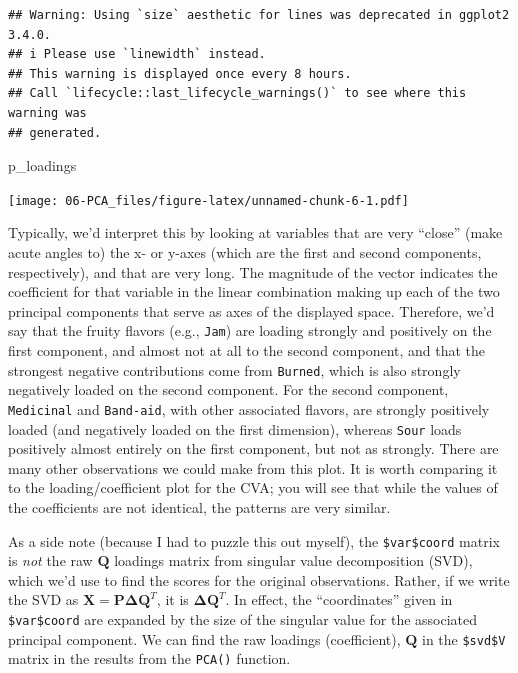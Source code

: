 \documentclass[
]{book}
\newenvironment{Shaded}{\begin{snugshade}}{\end{snugshade}}
\newcommand{\NormalTok}[1]{#1}
\begin{document}
\begin{verbatim}
## Warning: Using `size` aesthetic for lines was deprecated in ggplot2 3.4.0.
## i Please use `linewidth` instead.
## This warning is displayed once every 8 hours.
## Call `lifecycle::last_lifecycle_warnings()` to see where this warning was
## generated.
\end{verbatim}

\begin{Shaded}
\begin{Highlighting}[]
\NormalTok{p\_loadings}
\end{Highlighting}
\end{Shaded}

\texttt{[image: 06-PCA\_files/figure-latex/unnamed-chunk-6-1.pdf]}

Typically, we'd interpret this by looking at variables that are very ``close'' (make acute angles to) the x- or y-axes (which are the first and second components, respectively), and that are very long. The magnitude of the vector indicates the coefficient for that variable in the linear combination making up each of the two principal components that serve as axes of the displayed space. Therefore, we'd say that the fruity flavors (e.g., \texttt{Jam}) are loading strongly and positively on the first component, and almost not at all to the second component, and that the strongest negative contributions come from \texttt{Burned}, which is also strongly negatively loaded on the second component. For the second component, \texttt{Medicinal} and \texttt{Band-aid}, with other associated flavors, are strongly positively loaded (and negatively loaded on the first dimension), whereas \texttt{Sour} loads positively almost entirely on the first component, but not as strongly. There are many other observations we could make from this plot. It is worth comparing it to the loading/coefficient plot for the CVA; you will see that while the values of the coefficients are not identical, the patterns are very similar.

As a side note (because I had to puzzle this out myself), the \texttt{\$var\$coord} matrix is \emph{not} the raw \(\mathbf{Q}\) loadings matrix from singular value decomposition (SVD), which we'd use to find the scores for the original observations. Rather, if we write the SVD as \(\mathbf{X} = \mathbf{P \Delta Q}^T\), it is \(\mathbf{\Delta Q}^T\). In effect, the ``coordinates'' given in \texttt{\$var\$coord} are expanded by the size of the singular value for the associated principal component. We can find the raw loadings (coefficient), \(\mathbf Q\) in the \texttt{\$svd\$V} matrix in the results from the \texttt{PCA()} function.
\end{document}
